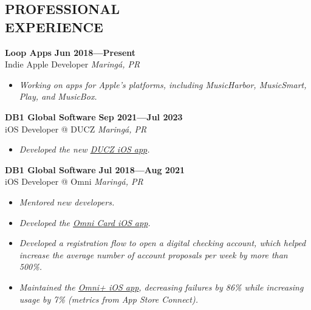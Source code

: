 \documentclass[line,margin]{res}
\begin{document}


\address{\sl \href{https://marcosatanaka.com}{marcosatanaka.com} --- \href{mailto:marcosatanaka@gmail.com}{marcosatanaka@gmail.com}}


\begin{resume}


\section{PROFESSIONAL \\ EXPERIENCE}
  {\bf Loop Apps} \hfill {\bf Jun 2018---Present} \\
  Indie Apple Developer \hfill {\sl Maring\'a, PR}\\[-6pt]
  \begin{itemize}
    \item {\sl Working on apps for Apple's platforms,  including MusicHarbor,  MusicSmart,  Play,  and MusicBox.}
  \end{itemize}
  
  {\bf DB1 Global Software} \hfill {\bf Sep 2021---Jul 2023} \\
  iOS Developer @ DUCZ \hfill {\sl Maring\'a, PR}\\[-6pt]
  \begin{itemize}
    \item {\sl Developed the new \href{https://apps.apple.com/br/app/id1592517753}{DUCZ iOS app}.}
  \end{itemize}
  
  {\bf DB1 Global Software} \hfill {\bf Jul 2018---Aug 2021} \\
  iOS Developer @ Omni \hfill {\sl Maring\'a, PR}\\[-6pt]
  \begin{itemize}
    \item {\sl Mentored new developers.}
    \item {\sl Developed the \href{https://apps.apple.com/br/app/id1490242421}{Omni Card iOS app}.}
    \item {\sl Developed a registration flow to open a digital checking account, which helped increase the average number of account proposals per week by more than 500\%.}
    \item {\sl Maintained the \href{https://apps.apple.com/br/app/omni/id1276332750}{Omni+ iOS app}, decreasing failures by 86\% while increasing usage by 7\% (metrics from App Store Connect).}
  \end{itemize}


\end{resume}
\end{document}
